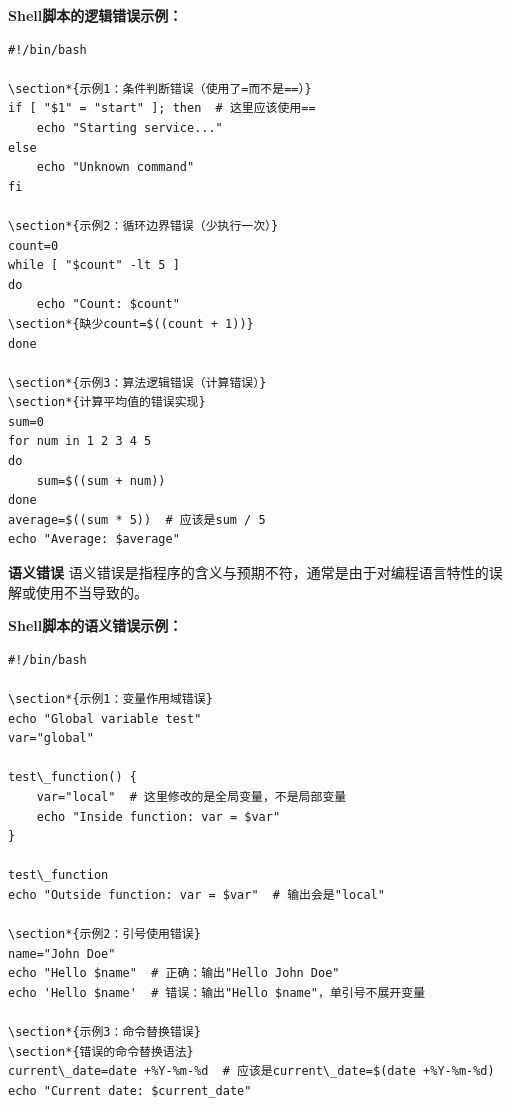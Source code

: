 \documentclass[12pt,UTF8]{ctexbook}
\begin{document}
\textbf{Shell脚本的逻辑错误示例：}
\begin{verbatim}
#!/bin/bash

\section*{示例1：条件判断错误（使用了=而不是==）}
if [ "$1" = "start" ]; then  # 这里应该使用==
    echo "Starting service..."
else
    echo "Unknown command"
fi

\section*{示例2：循环边界错误（少执行一次）}
count=0
while [ "$count" -lt 5 ]
do
    echo "Count: $count"
\section*{缺少count=$((count + 1))}
done

\section*{示例3：算法逻辑错误（计算错误）}
\section*{计算平均值的错误实现}
sum=0
for num in 1 2 3 4 5
do
    sum=$((sum + num))
done
average=$((sum * 5))  # 应该是sum / 5
echo "Average: $average"
\end{verbatim}

\textbf{语义错误}
语义错误是指程序的含义与预期不符，通常是由于对编程语言特性的误解或使用不当导致的。

\textbf{Shell脚本的语义错误示例：}
\begin{verbatim}
#!/bin/bash

\section*{示例1：变量作用域错误}
echo "Global variable test"
var="global"

test\_function() {
    var="local"  # 这里修改的是全局变量，不是局部变量
    echo "Inside function: var = $var"
}

test\_function
echo "Outside function: var = $var"  # 输出会是"local"

\section*{示例2：引号使用错误}
name="John Doe"
echo "Hello $name"  # 正确：输出"Hello John Doe"
echo 'Hello $name'  # 错误：输出"Hello $name"，单引号不展开变量

\section*{示例3：命令替换错误}
\section*{错误的命令替换语法}
current\_date=date +%Y-%m-%d  # 应该是current\_date=$(date +%Y-%m-%d)
echo "Current date: $current_date"
\end{verbatim}
\end{document}
